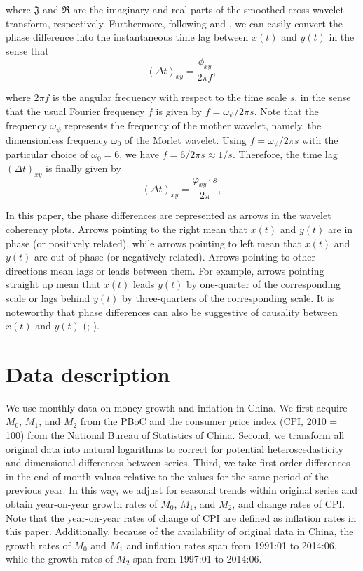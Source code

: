 \documentclass[a4paper,fleqn]{cas-sc}
\begin{document}
where $\mathfrak{J}$ and $\mathfrak{R}$ are the imaginary and real parts of the smoothed cross-wavelet transform, respectively. Furthermore, following \cite{voiculescu2012} and \cite{aguiar2014}, we can easily convert the phase difference into the instantaneous time lag between $x(t)$ and $y(t)$ in the sense that
\begin{equation}
    (\Delta t)_{xy}=\frac{\phi_{xy}}{2\pi f},
\end{equation}

where $2\pi f$ is the angular frequency with respect to the time scale $s$, in the sense that the usual Fourier frequency $f$ is given by $f = \omega_\psi / 2\pi s$. Note that the frequency $\omega_\psi$ represents the frequency of the mother wavelet, namely, the dimensionless frequency $\omega_0$ of the Morlet wavelet. Using $f = \omega_\psi / 2\pi s$ with the particular choice of $\omega_0 = 6$, we have $f = 6/2\pi s \approx 1/s$. Therefore, the time lag $(\Delta t)_{xy}$ is finally given by
\begin{equation}
    (\Delta t)_{xy}=\frac{\varphi_{xy}\cdot s}{2\pi},
\end{equation}

In this paper, the phase differences are represented as arrows in the wavelet coherency plots. Arrows pointing to the right mean that $x(t)$ and $y(t)$ are in phase (or positively related), while arrows pointing to left mean that $x(t)$ and $y(t)$ are out of
phase (or negatively related). Arrows pointing to other directions mean lags or leads between them. For example, arrows pointing straight up mean that $x(t)$ leads $y(t)$ by one-quarter of the corresponding scale or lags behind $y(t)$ by three-quarters of the corresponding scale.  It is noteworthy that phase differences can also be suggestive of causality between $x(t)$ and $y(t)$ (\citealp{grinsted2004}; \citealp*{tiwari2013}).


\section{Data description}\label{sec:4}
We use monthly data on money growth and inflation in China. We first acquire $M_0$, $M_1$, and $M_2$ from the PBoC and the consumer price index (CPI, 2010 = 100) from the National Bureau of Statistics of China. Second, we transform all original data into natural logarithms to correct for potential heteroscedasticity and dimensional differences between series. Third, we take first-order differences in the end-of-month values relative to the values for the same period of the previous year. In this way, we adjust for seasonal trends within original series and obtain year-on-year growth rates of $M_0$, $M_1$, and $M_2$, and change rates of CPI. Note that the year-on-year rates of change of CPI are defined as inflation rates in this paper. Additionally, because of the availability of original data in China, the growth rates of $M_0$ and $M_1$ and inflation rates span from 1991:01 to 2014:06, while the growth rates of $M_2$ span from 1997:01 to 2014:06.
\end{document}
